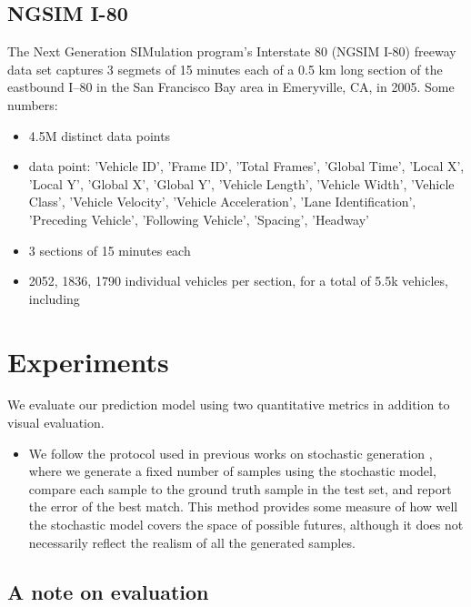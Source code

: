 \documentclass{article}
\begin{document}
\subsection{NGSIM I-80}
The Next Generation SIMulation program's Interstate 80 (NGSIM I-80) freeway data set \cite{halkias2006ngsim} captures 3 segmets of 15 minutes each of a 0.5 km long section of the eastbound I–80 in the San Francisco Bay area in Emeryville, CA, in 2005.
Some numbers:
\begin{itemize}
  \item 4.5M distinct data points
  \item data point: 'Vehicle ID', 'Frame ID', 'Total Frames', 'Global Time', 'Local X', 'Local Y', 'Global X', 'Global Y', 'Vehicle Length', 'Vehicle Width', 'Vehicle Class', 'Vehicle Velocity', 'Vehicle Acceleration', 'Lane Identification', 'Preceding Vehicle', 'Following Vehicle', 'Spacing', 'Headway'
  \item 3 sections of 15 minutes each
  \item 2052, 1836, 1790 individual vehicles per section, for a total of 5.5k vehicles, including

\end{itemize}




\section{Experiments}


We evaluate our prediction model using two quantitative metrics in addition to visual evaluation.
\begin{itemize}
\item We follow the protocol used in previous works on stochastic generation \citep{Walker2016, Babaeizadeh2018, Denton2018}, where we generate a fixed number of samples using the stochastic model, compare each sample to the ground truth sample in the test set, and report the error of the best match.
  This method provides some measure of how well the stochastic model covers the space of possible futures, although it does not necessarily reflect the realism of all the generated samples.
\end{itemize}


\subsection{A note on evaluation}
\end{document}
